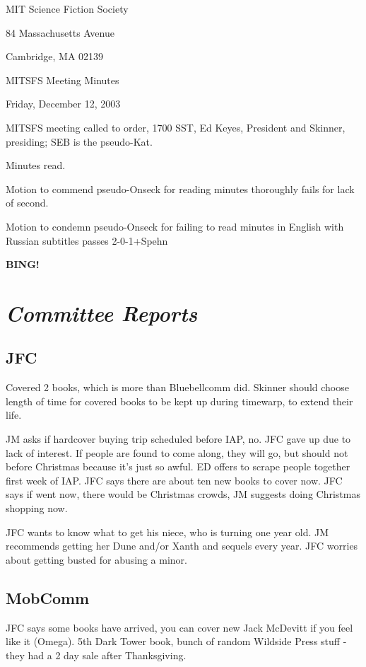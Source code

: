 \documentclass[10pt]{article}
\newcommand{\bing}{{\bf BING!} }
\newcommand{\goto}[1]{\bing \vskip 12pt \section*{{\em{#1}}}}
\begin{document}
\begin{center}

MIT Science Fiction Society 

84 Massachusetts Avenue

Cambridge, MA 02139

\vspace{12pt}

MITSFS Meeting Minutes 

Friday, December 12, 2003

\end{center}
 
\vspace{18pt}

\setlength{\parskip}{6pt}

\noindent
MITSFS meeting called to order, 1700 SST, Ed Keyes, President and
Skinner, presiding; SEB is the pseudo-Kat.

Minutes read.

Motion to commend pseudo-Onseck for reading minutes thoroughly fails
for lack of second.

Motion to condemn pseudo-Onseck for failing to read minutes in English
with Russian subtitles passes 2-0-1+Spehn

\goto{Committee Reports}
\subsection*{JFC}
Covered 2 books, which is more than Bluebellcomm did.  Skinner should
choose length of time for covered books to be kept up during timewarp,
to extend their life.

JM asks if hardcover buying trip scheduled before IAP, no.  JFC gave up
due to lack of interest.  If people are found to come along, they will
go, but should not before Christmas because it's just so awful.  ED
offers to scrape people together first week of IAP.  JFC says there
are about ten new books to cover now.  JFC says if went now, there
would be Christmas crowds, JM suggests doing Christmas shopping now.

JFC wants to know what to get his niece, who is turning one year old.
JM recommends getting her Dune and/or Xanth and sequels every year.
JFC worries about getting busted for abusing a minor.


\subsection*{MobComm }
JFC says some books have arrived, you can cover new Jack McDevitt if
you feel like it (Omega).  5th Dark Tower book, bunch of random
Wildside Press stuff - they had a 2 day sale after Thanksgiving.
\end{document}
